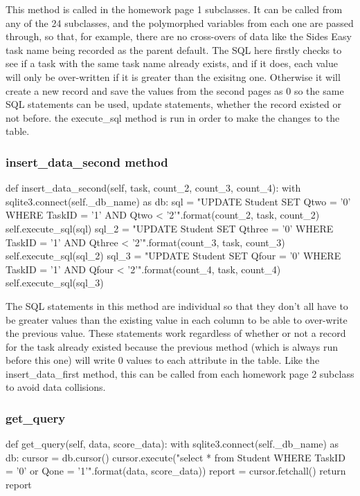 This method is called in the homework page 1 subclasses. It can be called from any of the 24 subclasses, and the polymorphed variables from each one are passed through, so that, for example, there are no cross-overs of data like the Sides Easy task name being recorded as the parent default. The SQL here firstly checks to see if a task with the same task name already exists, and if it does, each value will only be over-written if it is greater than the exisitng one. Otherwise it will create a new record and save the values from the second pages as 0 so the same SQL statements can be used, update statements, whether the record existed or not before. the execute\_sql method is run in order to make the changes to the table.

\subsubsection{insert\_data\_second method}

\begin{python}
def insert_data_second(self, task, count_2, count_3, count_4):
        with sqlite3.connect(self._db_name) as db:
            sql = "UPDATE Student SET Qtwo = '{0}' WHERE TaskID = '{1}' AND Qtwo < '{2}'".format(count_2, task, count_2)
            self.execute_sql(sql)
            sql_2 = "UPDATE Student SET Qthree = '{0}' WHERE TaskID = '{1}' AND Qthree < '{2}'".format(count_3, task, count_3)
            self.execute_sql(sql_2)
            sql_3 = "UPDATE Student SET Qfour = '{0}' WHERE TaskID = '{1}' AND Qfour < '{2}'".format(count_4, task, count_4)
            self.execute_sql(sql_3)
\end{python}

The SQL statements in this method are individual so that they don't all have to be greater values than the existing value in each column to be able to over-write the previous value. These statements work regardless of whether or not a record for the task already existed because the previous method (which is always run before this one) will write 0 values to each attribute in the table. Like the insert\_data\_first method, this can be called from each homework page 2 subclass to avoid data collisions.

\subsubsection{get\_query}

\begin{python}
    def get_query(self, data, score_data):
        with sqlite3.connect(self._db_name) as db:
            cursor = db.cursor()
            cursor.execute("select * from Student WHERE TaskID = '{0}' or Qone = '{1}'".format(data, score_data))
            report = cursor.fetchall()
            return report
\end{python}

